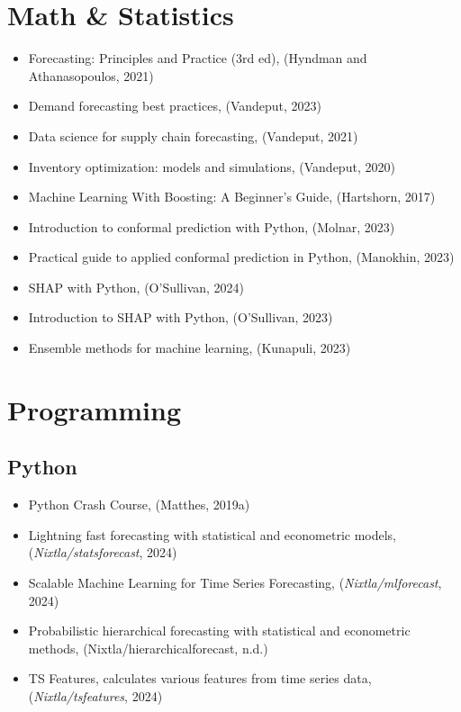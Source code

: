 \documentclass[
  american,
  10,
  a4paper,
]{book}
\providecommand{\tightlist}{%
  \setlength{\itemsep}{0pt}\setlength{\parskip}{0pt}}
\theoremstyle{definition}
\theoremstyle{remark}
\begin{document}
\section{Math \& Statistics}\label{math-statistics}

\begin{itemize}
\tightlist
\item
  Forecasting: Principles and Practice (3rd ed), (Hyndman and
  Athanasopoulos, 2021)
\item
  Demand forecasting best practices, (Vandeput, 2023)
\item
  Data science for supply chain forecasting, (Vandeput, 2021)
\item
  Inventory optimization: models and simulations, (Vandeput, 2020)
\item
  Machine Learning With Boosting: A Beginner's Guide, (Hartshorn, 2017)
\item
  Introduction to conformal prediction with Python, (Molnar, 2023)
\item
  Practical guide to applied conformal prediction in Python, (Manokhin,
  2023)
\item
  SHAP with Python, (O'Sullivan, 2024)
\item
  Introduction to SHAP with Python, (O'Sullivan, 2023)
\item
  Ensemble methods for machine learning, (Kunapuli, 2023)
\end{itemize}

\section{Programming}\label{programming}

\subsection{Python}\label{python}

\begin{itemize}
\tightlist
\item
  Python Crash Course, (Matthes, 2019a)
\item
  Lightning fast forecasting with statistical and econometric models,
  (\emph{Nixtla/statsforecast}, 2024)
\item
  Scalable Machine Learning for Time Series Forecasting,
  (\emph{Nixtla/mlforecast}, 2024)
\item
  Probabilistic hierarchical forecasting with statistical and
  econometric methods, (Nixtla/hierarchicalforecast, n.d.)
\item
  TS Features, calculates various features from time series data,
  (\emph{Nixtla/tsfeatures}, 2024)
\end{itemize}
\end{document}
